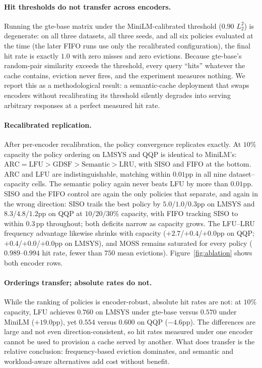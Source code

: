 \documentclass[sigconf,nonacm]{acmart}
\begin{document}
\paragraph{Hit thresholds do not transfer across encoders.}
Running the gte-base matrix under the MiniLM-calibrated threshold ($0.90$
$L_2^2$) is degenerate: on all three datasets, all three seeds, and all six
policies evaluated at the time (the later FIFO runs use only the
recalibrated configuration), the final hit rate is exactly $1.0$ with zero
misses and zero evictions. Because gte-base's random-pair similarity exceeds the threshold,
every query ``hits'' whatever the cache contains, eviction never fires, and
the experiment measures nothing. We report this as a methodological result:
a semantic-cache deployment that swaps encoders without recalibrating its
threshold silently degrades into serving arbitrary responses at a perfect
measured hit rate.

\paragraph{Recalibrated replication.}
After per-encoder recalibration, the policy convergence replicates exactly. At
$10\%$ capacity the policy ordering on LMSYS and QQP is identical to MiniLM's:
$\text{ARC}=\text{LFU} > \text{GDSF} > \text{Semantic} > \text{LRU}$, with
SISO and FIFO at the bottom. ARC and LFU are indistinguishable, matching within $0.01$pp in
all nine dataset--capacity cells. The semantic policy again never beats LFU by more than $0.01$pp.
SISO and the FIFO control are again the only policies that separate, and
again in the wrong direction: SISO trails the best policy by
$5.0$/$1.0$/$0.3$pp on LMSYS and $8.3$/$4.8$/$1.2$pp on QQP at $10/20/30\%$
capacity, with FIFO tracking SISO to within $0.3$\,pp throughout; both
deficits narrow as capacity grows. The LFU--LRU frequency advantage likewise shrinks with
capacity ($+2.7$/$+0.4$/$+0.0$pp on QQP; $+0.4$/$+0.0$/$+0.0$pp on LMSYS),
and MOSS remains saturated for every policy ($0.989$--$0.994$ hit rate, fewer
than $750$ mean evictions). Figure~\ref{fig:ablation} shows both encoder rows.

\paragraph{Orderings transfer; absolute rates do not.}
While the ranking of policies is encoder-robust, absolute hit rates are not:
at $10\%$ capacity, LFU achieves $0.760$ on LMSYS under gte-base versus
$0.570$ under MiniLM ($+19.0$pp), yet $0.554$ versus $0.600$ on QQP
($-4.6$pp). The differences are large and not even direction-consistent,
so hit rates measured under one encoder cannot be used to provision a cache
served by another. What does transfer is the relative conclusion:
frequency-based eviction dominates, and semantic and workload-aware
alternatives add cost without benefit.
\end{document}
